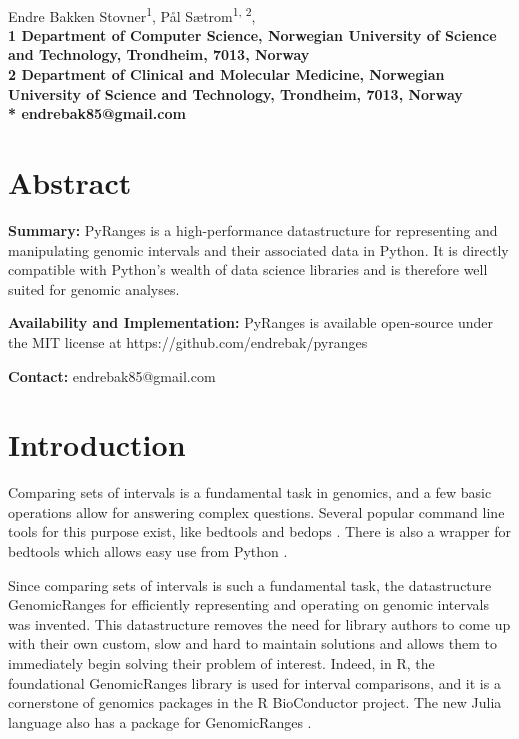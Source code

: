 \documentclass[10pt,letterpaper]{article}
\begin{document}
\vspace*{0.35in}

\begin{flushleft}
{\Large
  \textbf{}
}
\newline
\\
Endre Bakken Stovner\textsuperscript{1},
Pål Sætrom\textsuperscript{1, 2},
\\
\bf{1} Department of
  Computer Science, Norwegian University
  of Science and Technology, Trondheim, 7013, Norway
\\
\bf{2} Department of Clinical and Molecular Medicine, Norwegian
  University of Science and Technology, Trondheim, 7013, Norway
\\
\bigskip
* endrebak85@gmail.com

\end{flushleft}

\section*{Abstract}

\textbf{Summary:} PyRanges is a high-performance datastructure for representing
and manipulating genomic intervals and their associated data in Python. It is
directly compatible with Python's wealth of data science libraries and is
therefore well suited for genomic analyses.

\textbf{Availability and Implementation:} PyRanges is available open-source under
the MIT license at https://github.com/endrebak/pyranges

\textbf{Contact:} endrebak85@gmail.com

\section*{Introduction}

Comparing sets of intervals is a fundamental task in genomics, and a few basic
operations allow for answering complex questions. Several popular command
line tools for this purpose exist, like bedtools
\cite{doi:10.1093/bioinformatics/btq033} and bedops
\cite{doi:10.1093/bioinformatics/bts277}. There is also a wrapper for bedtools
which allows easy use from Python \cite{doi:10.1093/bioinformatics/btr539}.

Since comparing sets of intervals is such a fundamental task, the datastructure
GenomicRanges for efficiently representing and operating on genomic intervals
was invented. This datastructure removes the need for library authors to come up
with their own custom, slow and hard to maintain solutions and allows them to
immediately begin solving their problem of interest. Indeed, in R, the
foundational GenomicRanges library \cite{10.1371/journal.pcbi.1003118} is used
for interval comparisons, and it is a cornerstone of genomics packages in the R
BioConductor \cite{Gentleman2004} project. The new Julia language
\cite{doi:10.1137/141000671} also has a package for GenomicRanges
\cite{Haverty2017}.
\end{document}
